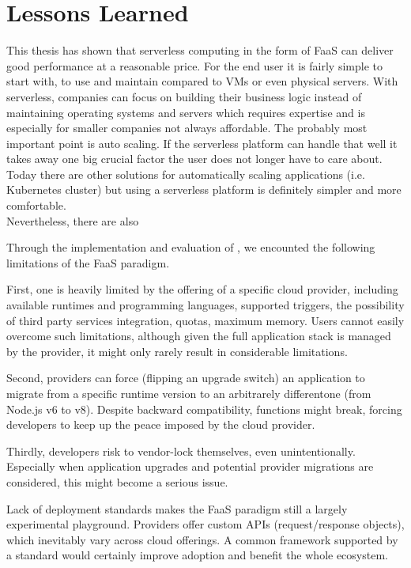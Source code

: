 
\section{Lessons Learned}\label{sec:lessons}
This thesis has shown that serverless computing in the form of \gls{FaaS} can deliver good performance at a reasonable price. For the end user it is fairly simple to start with, to use and maintain compared to \gls{VM}s or even physical servers. With serverless, companies can focus on building their business logic instead of maintaining operating systems and servers which requires expertise and is especially for smaller companies not always affordable. The probably most important point is auto scaling. If the serverless platform can handle that well it takes away one big crucial factor the user does not longer have to care about. Today there are other solutions for automatically scaling applications (i.e. Kubernetes cluster) but using a serverless platform is definitely simpler and more comfortable.\\
Nevertheless, there are also 

Through the implementation and evaluation of \sys, we encounted the following limitations of the FaaS paradigm. 

First, one is heavily limited by the offering of a specific cloud provider, including
available runtimes and programming languages, supported triggers, the possibility of third party 
services integration, quotas, maximum memory. 
Users cannot easily overcome such limitations, although given the full application stack is managed by the provider, it might only rarely result in considerable limitations.

Second, providers can force (\eg flipping an upgrade switch) an application to migrate from a specific runtime version to an arbitrarely differentone (\eg from Node.js v6 to v8).
Despite backward compatibility, functions might break, forcing developers to keep up the peace imposed by the cloud provider.

Thirdly, developers risk to vendor-lock themselves, even unintentionally.
Especially when application upgrades and potential provider migrations are considered, this might become a serious issue.

Lack of deployment standards makes the FaaS paradigm still a largely experimental playground.
Providers offer custom APIs (\eg request/response objects), which inevitably vary across cloud offerings.
A common framework supported by a standard would certainly improve adoption and benefit the whole ecosystem.


